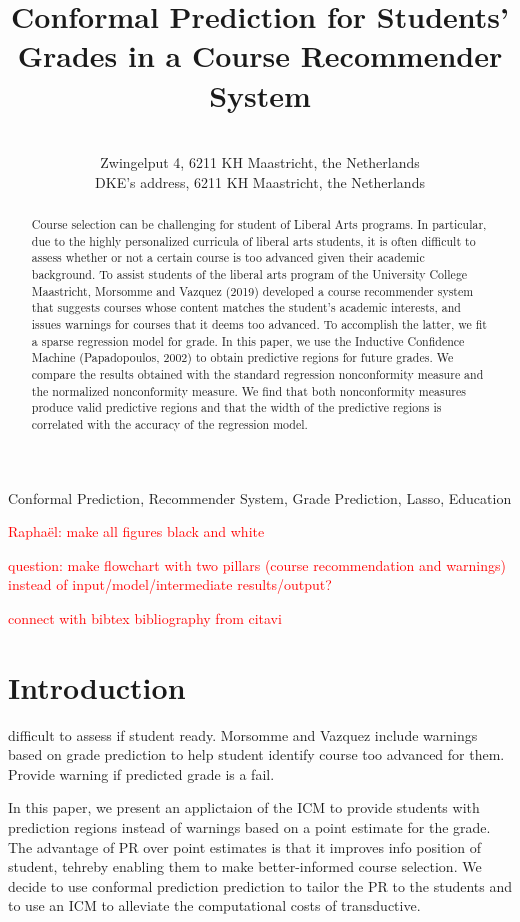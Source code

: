 \documentclass[pmlr]{jmlr}%
\title[Conformal Prediction for Students' Grades]{Conformal Prediction for Students' Grades in a Course Recommender System\titletag{\thanks{XXX}}}
\author{\Name{Rapha\"{e}l Morsomme\nametag{\thanks{with a note}}} \Email{raphael.morsomme@maastrichtuniversity.nl}\\
   \addr Zwingelput 4, 6211 KH Maastricht, the Netherlands	
   \AND
   \Name{Evgueni Smirnov} \Email{smirnov@maastrichtuniversity.nl}\\
   \addr DKE's address, 6211 KH Maastricht, the Netherlands}
\newcommand\todo[1]{\textcolor{red}{#1}}
\begin{document}
\maketitle

\begin{abstract}
Course selection can be challenging for student of Liberal Arts programs. In particular, due to the highly personalized curricula of liberal arts students, it is often difficult to assess whether or not a certain course is too advanced given their academic background. To assist students of the liberal arts program of the University College Maastricht, Morsomme and Vazquez (2019) developed a course recommender system that suggests courses whose content matches the student's academic interests, and issues warnings for courses that it deems too advanced. To accomplish the latter, we fit a sparse regression model for grade. In this paper, we use the Inductive Confidence Machine (Papadopoulos, 2002) to obtain predictive regions for future grades. We compare the results obtained with the standard regression nonconformity measure and the normalized nonconformity measure. We find that both nonconformity measures produce valid predictive regions and that the width of the predictive regions is correlated with the accuracy of the regression model.
\end{abstract}

\begin{keywords} Conformal Prediction, Recommender System, Grade Prediction, Lasso, Education \end{keywords}

\todo{Rapha\"{e}l: make all figures black and white}

\todo{question: make flowchart with two pillars (course recommendation and warnings) instead of input/model/intermediate results/output?}

\todo{connect with bibtex bibliography from citavi}

\section{Introduction}
\label{sec:intro}

difficult to assess if student ready. 
Morsomme and Vazquez include warnings based on grade prediction to help student identify course too advanced for them. Provide warning if predicted grade is a fail.

In this paper, we present an applictaion of the ICM to provide students with prediction regions instead of warnings based on a point estimate for the grade. The advantage of PR over point estimates is that it improves info position of student, tehreby enabling them to make better-informed course selection. We decide to use conformal prediction prediction to tailor the PR to the students and to use an ICM to alleviate the computational costs of transductive. 
\end{document}
